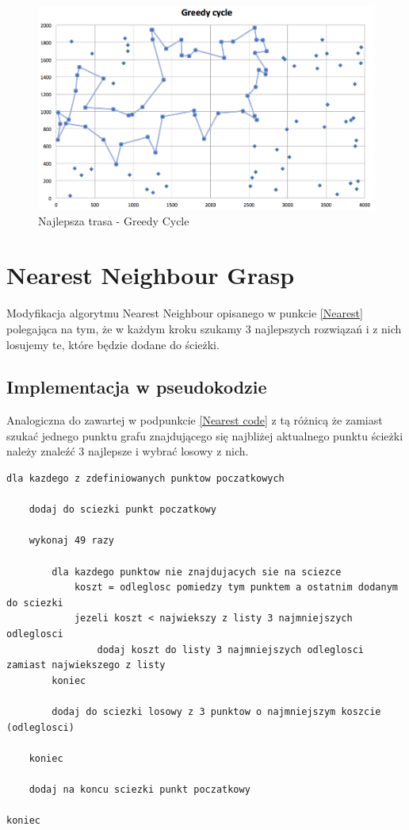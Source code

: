 \documentclass[a4paper 10pt]{article}
\begin{document}
\begin{figure} [H]
\centering
\includegraphics[angle=0,width = 1\textwidth, height=!]{images/GC.png}
\caption{Najlepsza trasa - Greedy Cycle}
\label{Rys. NN}
\end{figure}

\section{Nearest Neighbour Grasp}
Modyfikacja algorytmu Nearest Neighbour opisanego w punkcie \ref{Nearest} polegająca na tym, że w każdym kroku szukamy 3 najlepszych rozwiązań i z nich losujemy te, które będzie dodane do ścieżki.
\subsection{Implementacja w pseudokodzie}
Analogiczna do zawartej w podpunkcie \ref{Nearest code} z tą różnicą że zamiast szukać jednego punktu grafu znajdującego się najbliżej aktualnego punktu ścieżki należy znaleźć 3 najlepsze i wybrać losowy z nich.

\begin{lstlisting}[frame=single]
dla kazdego z zdefiniowanych punktow poczatkowych
	
	dodaj do sciezki punkt poczatkowy
			
	wykonaj 49 razy 
	
		dla kazdego punktow nie znajdujacych sie na sciezce
			koszt = odleglosc pomiedzy tym punktem a ostatnim dodanym do sciezki
			jezeli koszt < najwiekszy z listy 3 najmniejszych odleglosci
				dodaj koszt do listy 3 najmniejszych odleglosci zamiast najwiekszego z listy
		koniec
	
		dodaj do sciezki losowy z 3 punktow o najmniejszym koszcie (odleglosci)
		
	koniec	
	
	dodaj na koncu sciezki punkt poczatkowy
	
koniec

\end{lstlisting}
\end{document}
